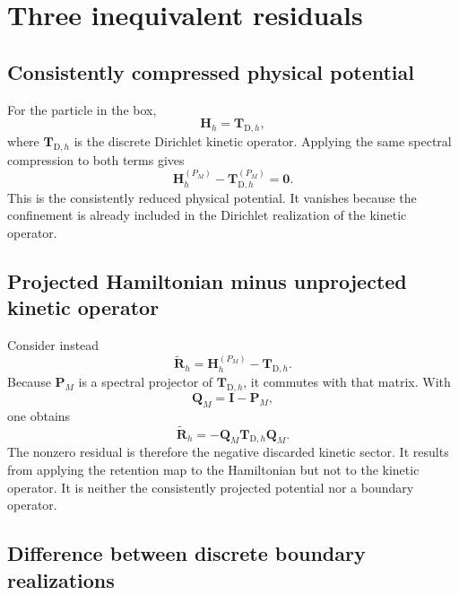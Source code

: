 \section{Three inequivalent residuals}


\subsection{Consistently compressed physical potential}

For the particle in the box,
\begin{equation}
    \mathbf H_h=\mathbf T_{\mathrm D,h},
\end{equation}
where $\mathbf T_{\mathrm D,h}$ is the discrete Dirichlet kinetic operator.
Applying the same spectral compression to both terms gives
\begin{equation}
    \mathbf H_h^{(P_M)}
    -
    \mathbf T_{\mathrm D,h}^{(P_M)}
    =
    \mathbf 0.
\end{equation}
This is the consistently reduced physical potential. It vanishes because the
confinement is already included in the Dirichlet realization of the kinetic
operator.

\subsection{Projected Hamiltonian minus unprojected kinetic operator}

Consider instead
\begin{equation}
    \widetilde{\mathbf R}_h
    =
    \mathbf H_h^{(P_M)}
    -
    \mathbf T_{\mathrm D,h}.
\end{equation}
Because $\mathbf P_M$ is a spectral projector of
$\mathbf T_{\mathrm D,h}$, it commutes with that matrix. With
\begin{equation}
    \mathbf Q_M=\mathbf I-\mathbf P_M,
\end{equation}
one obtains
\begin{equation}
    \widetilde{\mathbf R}_h
    =
    -\mathbf Q_M
    \mathbf T_{\mathrm D,h}
    \mathbf Q_M.
\end{equation}
The nonzero residual is therefore the negative discarded kinetic sector. It
results from applying the retention map to the Hamiltonian but not to the
kinetic operator. It is neither the consistently projected potential nor a
boundary operator.

\subsection{Difference between discrete boundary realizations}

